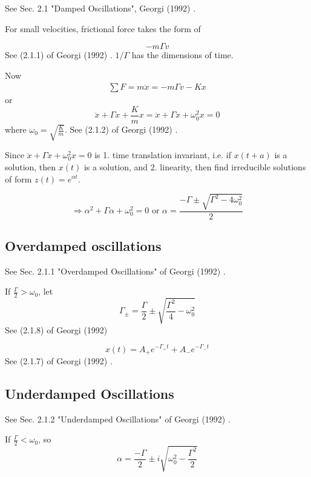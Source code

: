 \documentclass[10pt]{amsart}
\begin{document}
\begin{multicols*}{2}
See Sec. 2.1 "Damped Oscillations", Georgi (1992) \cite{Geor1992}.

For small velocities, frictional force takes the form of

\begin{equation}
	-m\Gamma v
\end{equation}
See (2.1.1) of Georgi (1992) \cite{Geor1992}. $1/\Gamma$ has the dimensions of time.

Now
\[
\begin{gathered}
	\sum F = m\ddot{x} = -m \Gamma v - Kx
\end{gathered}
\]
or
\begin{equation}
	\ddot{x} + \Gamma \dot{x} + \frac{K}{m} x = \ddot{x} + \Gamma \dot{x} + \omega_0^2 x = 0
\end{equation}
where $\omega_0 = \sqrt{ \frac{K}{m} }$. See (2.1.2) of Georgi (1992) \cite{Geor1992}.

Since $\ddot{x} + \Gamma \dot{x} + \omega_0^2 x = 0$ is 1. time translation invariant, i.e. if $x(t+a)$ is a solution, then $x(t)$ is a solution, and 2. linearity, then find irreducible solutions of form $z(t) = e^{\alpha t}$.

\[
\Longrightarrow \alpha^2 + \Gamma \alpha + \omega_0^2 =0 \text{ or } \alpha = \frac{ -\Gamma \pm \sqrt{ \Gamma^2 - 4\omega_0^2}}{2}
\]

\subsection{Overdamped oscillations} See Sec. 2.1.1 "Overdamped Oscillations" of Georgi (1992) \cite{Geor1992}.

If $\frac{\Gamma}{2} > \omega_0$, let
\begin{equation}
	\Gamma_{\pm} = \frac{\Gamma}{2} \pm \sqrt{ \frac{\Gamma^2}{4} - \omega_0^2}
\end{equation}
See (2.1.8) of Georgi (1992) \cite{Geor1992}

\begin{equation}
	x(t) = A_+ e^{-\Gamma_+ t} + A_- e^{-\Gamma_- t}
\end{equation}
See (2.1.7) of Georgi (1992) \cite{Geor1992}.

\subsection{Underdamped Oscillations} See Sec. 2.1.2 "Underdamped Oscillations" of Georgi (1992) \cite{Geor1992}.

If $\frac{\Gamma}{2} < \omega_0$, so
\[
\alpha = \frac{-\Gamma }{2} \pm i \sqrt{ \omega_0^2 - \frac{\Gamma^2}{2} } 
\]


\end{multicols*}
\end{document}
